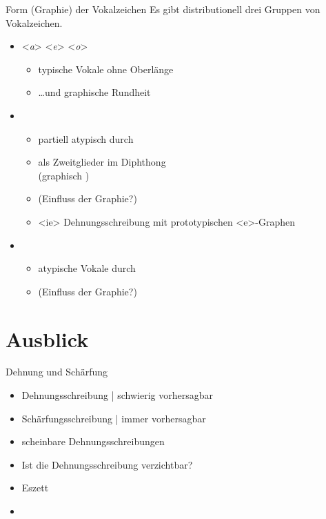 \begin{frame}
  {Form (Graphie) der Vokalzeichen}
  \onslide<+->
  \onslide<+->
  Es gibt distributionell drei Gruppen von Vokalzeichen.\\
  \Zeile
  \begin{itemize}[<+->]
    \item \alert{<\textit{a}> <\textit{e}> <\textit{o}>}
      \begin{itemize}[<+->]
        \item typische Vokale \alert{ohne Oberlänge}
        \item \ldots und \alert{graphische Rundheit}
      \end{itemize}
      \Halbzeile
    \item {}
      \begin{itemize}[<+->]
        \item partiell atypisch durch 
        \item als Zweitglieder im Diphthong \\
          (graphisch )
        \item {} (Einfluss der Graphie?)
        \item{} <ie> Dehnungsschreibung mit prototypischen <e>-Graphen
      \end{itemize}
      \Halbzeile
    \item {}
      \begin{itemize}[<+->]
        \item atypische Vokale durch 
        \item {} (Einfluss der Graphie?)
      \end{itemize}
  \end{itemize}
\end{frame}


\section{Ausblick}

\begin{frame}
  {Dehnung und Schärfung}
  \onslide<+->
  \begin{itemize}[<+->]
    \item Dehnungsschreibung | schwierig vorhersagbar
    \item Schärfungsschreibung | immer vorhersagbar
    \item scheinbare Dehnungsschreibungen
    \item Ist die Dehnungsschreibung verzichtbar?
      \Zeile
    \item Eszett
      \Zeile
    \item \citet[Kapitel~15]{Schaefer2018b}
  \end{itemize}
\end{frame}
